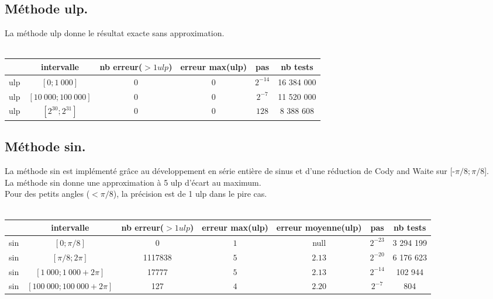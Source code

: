 \documentclass[a4,12pt]{article}
\begin{document}
\subsection{Méthode ulp.}
La méthode ulp donne le résultat exacte sans approximation.\\
\\

\hspace{-2cm}
\begin{tabular}{|c|c|c|c|c|c|}

\hline 
 & intervalle & nb erreur($>1 ulp$) & erreur max(ulp) & pas & nb tests \\
\hline 
ulp & $[0; 1\ 000]$ & 0 & $0$ & $2^{-14}$ & 16 384 000\\
\hline 
ulp & $[10\ 000; 100\ 000]$ & 0 & $0$ & $2^{-7}$ & 11 520 000\\
\hline 
ulp & $[2^{30}; 2^{31}]$ & 0 & $0$ & $128$ & 8 388 608\\
\hline
\end{tabular}

\subsection{Méthode sin.}
La méthode sin est implémenté grâce au développement en série entière de sinus et d'une réduction de Cody and Waite sur [-$\pi /8; \pi /8$].\\
La méthode sin donne une approximation à 5 ulp d'écart au maximum.\\
Pour des petits angles ($<\pi /8$), la précision est de 1 ulp dans le pire cas.\\
\\

\hspace{-4cm}\begin{tabular}{|c|c|c|c|c|c|c|}

\hline 
 & intervalle & nb erreur($>1 ulp$) & erreur max(ulp)& erreur moyenne(ulp) & pas & nb tests \\
\hline 
sin & $[0; \pi /8]$             & 0       & $1$ & null        &$2^{-23}$ & 3 294 199\\
\hline 
sin & $[\pi /8; 2\pi]$          & 1117838 & $5$ &$2.13$ & $2^{-20}$ & 6 176 623\\
\hline 
sin & $[1\ 000; 1\ 000 + 2\pi]$     & 17777    & $5$ &$2.13$ & $2^{-14}$ & 102 944\\
\hline 
sin & $[100\ 000; 100\ 000 + 2\pi]$ & 127      & $4$ &$ 2.20$ & $2^{-7}$ & 804\\
\hline
\end{tabular}
\end{document}
